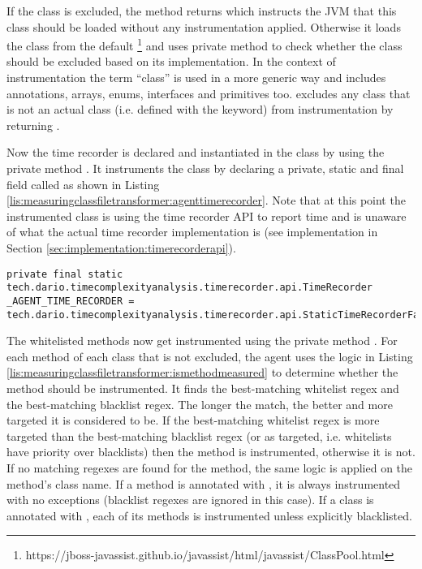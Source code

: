 \noindent If the class is excluded, the method returns  which instructs the JVM that this class should be loaded without any instrumentation applied. Otherwise it loads the class from the default \footnote{https://jboss-javassist.github.io/javassist/html/javassist/ClassPool.html} and uses private method  to check whether the class should be excluded based on its implementation. In the context of instrumentation the term \enquote{class} is used in a more generic way and includes annotations, arrays, enums, interfaces and primitives too.  excludes any class that is not an actual class (i.e. defined with the  keyword) from instrumentation by returning .

\noindent Now the time recorder is declared and instantiated in the class by using the private method . It instruments the class by declaring a private, static and final field called  as shown in Listing \ref{lis:measuringclassfiletransformer:agenttimerecorder}. Note that at this point the instrumented class is using the time recorder API to report time and is unaware of what the actual time recorder implementation is (see implementation in Section \ref{sec:implementation:timerecorderapi}).

\begin{lstlisting}[breaklines,caption={$\_AGENT\_TIME\_RECORDER$ initialization},label=lis:measuringclassfiletransformer:agenttimerecorder]
private final static tech.dario.timecomplexityanalysis.timerecorder.api.TimeRecorder _AGENT_TIME_RECORDER = tech.dario.timecomplexityanalysis.timerecorder.api.StaticTimeRecorderFactory.getTimeRecorder();
\end{lstlisting}

\noindent The whitelisted methods now get instrumented using the private method . For each method of each class that is not excluded, the agent uses the logic in Listing \ref{lis:measuringclassfiletransformer:ismethodmeasured} to determine whether the method should be instrumented. It finds the best-matching whitelist regex and the best-matching blacklist regex. The longer the match, the better and more targeted it is considered to be. If the best-matching whitelist regex is more targeted than the best-matching blacklist regex (or as targeted, i.e. whitelists have priority over blacklists) then the method is instrumented, otherwise it is not. If no matching regexes are found for the method, the same logic is applied on the method's class name. \noindent If a method is annotated with , it is always instrumented with no exceptions (blacklist regexes are ignored in this case). If a class is annotated with , each of its methods is instrumented unless explicitly blacklisted.

